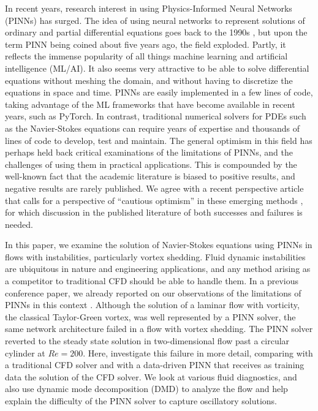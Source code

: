 
In recent years, research interest in using Physics-Informed Neural Networks (PINNs) has surged.
The idea of using neural networks to represent solutions of ordinary and partial differential equations goes back to the 1990s \cite{dissanayake_neural-network-based_1994,lagaris_artificial_1998}, but upon the term PINN being coined about five years ago, the field exploded. 
Partly, it reflects the immense popularity of all things machine learning and artificial intelligence (ML/AI). 
It also seems very attractive to be able to solve differential equations without meshing the domain, and without having to discretize the equations in space and time. 
PINNs are easily implemented in a few lines of code, taking advantage of the ML frameworks that have become available in recent years, such as PyTorch. 
In contrast, traditional numerical solvers for PDEs such as the Navier-Stokes equations can require years of expertise and thousands of lines of code to develop, test and maintain. 
The general optimism in this field has perhaps held back critical examinations of the limitations of PINNs, and the challenges of using them in practical applications. 
This is compounded by the well-known fact that the academic literature is biased to positive results, and negative results are rarely published. 
We agree with a recent perspective article that calls for a perspective of ``cautious optimism'' in these emerging methods \cite{vinuesa_emerging_2022}, for which discussion in the published literature of both successes and failures is needed.

In this paper, we examine the solution of Navier-Stokes equations using PINNs in flows with instabilities, particularly vortex shedding. 
Fluid dynamic instabilities are ubiquitous in nature and engineering applications, and any method arising as a competitor to traditional CFD should be able to handle them. 
In a previous conference paper, we already reported on our observations of the limitations of PINNs in this context \cite{chuang_experience_2022}. 
Although the solution of a laminar flow with vorticity, the classical Taylor-Green vortex, was well represented by a PINN solver, the same network architecture failed in a flow with vortex shedding. 
The PINN solver reverted to the steady state solution in two-dimensional flow past a circular cylinder at $Re=200$. 
Here, investigate this failure in more detail, comparing with a traditional CFD solver and with a data-driven PINN that receives as training data the solution of the CFD solver. 
We look at various fluid diagnostics, and also use dynamic mode decomposition (DMD) to analyze the flow and help explain the difficulty of the PINN solver to capture oscillatory solutions.

